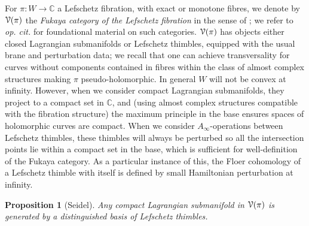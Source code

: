 \documentclass[reqno,10pt]{amsart}
\numberwithin{equation}{section}
\newcommand{\bC}{{\mathbb C}}
\newcommand{\scrV}{\EuScript{V}}
\newtheorem{Proposition}[thm]{Proposition}
\theoremstyle{remark}
\begin{document}
For $\pi: W \rightarrow \bC$ a Lefschetz fibration, with exact or monotone fibres, we denote by $\scrV(\pi)$ the \emph{Fukaya category of the Lefschetz fibration} in the sense of \cite[Section 18]{FCPLT}; we refer to \emph{op. \!cit.} for foundational material on such categories.     $\scrV(\pi)$ has objects  either closed Lagrangian submanifolds or Lefschetz thimbles, equipped with the usual brane and perturbation data;  we recall that one can achieve transversality for curves without components contained in fibres within the class of almost complex structures making $\pi$ pseudo-holomorphic.  In general $W$ will not be convex at infinity.   However, when we consider compact Lagrangian submanifolds, they project to a compact set in $\bC$, and (using almost complex structures compatible with the fibration structure) the maximum principle in the base ensures spaces of holomorphic curves are compact. When we consider $A_{\infty}$-operations between Lefschetz thimbles, these thimbles will always be perturbed so all the intersection points lie within a compact set in the base, which is sufficient for well-definition of the Fukaya category.  As a particular instance of this, the Floer cohomology of a Lefschetz thimble with itself is defined by small Hamiltonian perturbation at infinity.  

\begin{Proposition}[Seidel] \label{Prop:generate}
Any compact Lagrangian submanifold in $\scrV(\pi)$ is generated by a distinguished basis of Lefschetz thimbles.
\end{Proposition}
\end{document}
